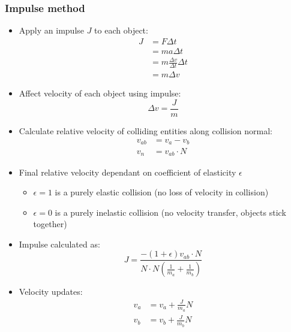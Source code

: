 \documentclass[a4paper]{article}
\begin{document}
\subsubsection{Impulse method}

\begin{itemize}
  \item
    Apply an impulse $J$ to each object:
    \begin{align*}
      J &= F \Delta t \\
        &= ma \Delta t \\
        &= m \frac{\Delta v}{\Delta t} \Delta t \\
        &= m \Delta v
    \end{align*}

  \item
    Affect velocity of each object using impulse:
    \[
      \Delta v = \frac{J}{m}
    \]

\end{itemize}


\begin{itemize}
  \item
    Calculate relative velocity of colliding entities along collision normal:
    \begin{align*}
      v_{ab} &= v_{a} - v_{b} \\
      v_{n} &= v_{ab} \cdot N
    \end{align*}

  \item
    Final relative velocity dependant on coefficient of elasticity $\epsilon$
    \begin{itemize}
      \item
        $\epsilon = 1$ is a purely elastic collision (no loss of velocity in
        collision)

      \item
        $\epsilon = 0$ is a purely inelastic collision (no velocity transfer,
        objects stick together)

    \end{itemize}

  \item
    Impulse calculated as:
    \[
      J = \frac{-(1 + \epsilon) v_{ab} \cdot N}
               {N \cdot N\left(\frac{1}{m_{a}} + \frac{1}{m_{b}}\right)}
    \]

  \item
    Velocity updates:
    \begin{align*}
      v_{a} &= v_{a} + \frac{J}{m_{a}} N \\
      v_{b} &= v_{b} + \frac{J}{m_{b}} N
    \end{align*}

\end{itemize}
\end{document}

